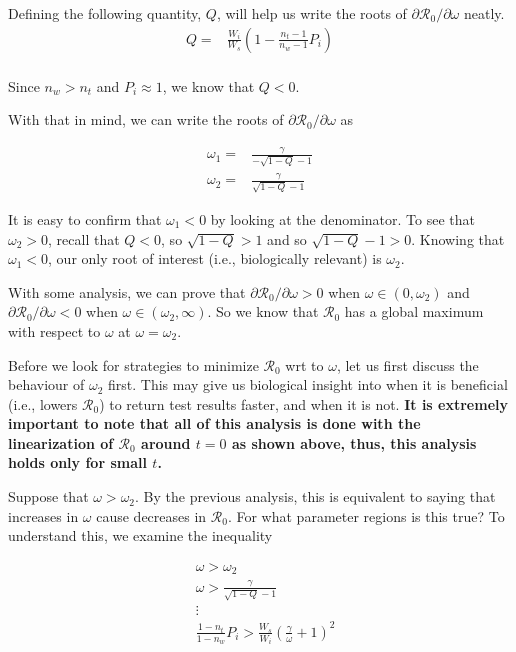 \documentclass{article}
\newcommand{\Rnum}{\mathcal{R}_0}
\begin{document}
Defining the following quantity, $Q$, will help us write the roots of $\partial{\Rnum}/\partial{\omega}$ neatly. 
\begin{align}\label{eq:defQ}
    Q =& \frac{W_i}{W_s}\left(1-\frac{n_{t}-1}{n_{w}-1}P_{i}\right) \\
\end{align}

Since $n_w > n_t$ and $P_i \approx 1$, we know that $Q < 0$.

With that in mind, we can write the roots of $\partial{\Rnum}/\partial{\omega}$ as

\begin{align}
    \omega_1 =& \frac{\gamma}{-\sqrt{1-Q}-1} \\
    \omega_2 =& \frac{\gamma}{\sqrt{1-Q}-1}
\end{align}

It is easy to confirm that $\omega_1 < 0$ by looking at the denominator. To see that $\omega_2 > 0$, recall that $Q < 0$, so $\sqrt{1-Q} > 1$ and so $\sqrt{1-Q} -1 > 0$. Knowing that $\omega_1 < 0$, our only root of interest (i.e., biologically relevant) is $\omega_2$. 

With some analysis, we can prove that $\partial{\Rnum}/\partial{\omega} > 0$ when $\omega \in (0,\omega_2)$ and $\partial{\Rnum}/\partial{\omega} < 0$ when $\omega \in (\omega_2,\infty)$. So we know that $\Rnum$ has a global maximum with respect to $\omega$ at $\omega = \omega_2$.

Before we look for strategies to minimize $\Rnum$ wrt to $\omega$, let us first discuss the behaviour of $\omega_2$ first. This may give us biological insight into when it is beneficial (i.e., lowers $\Rnum$) to return test results faster, and when it is not. \textbf{It is extremely important to note that all of this analysis is done with the linearization of $\Rnum$ around $t = 0$ as shown above, thus, this analysis holds only for small $t$.}

Suppose that $\omega > \omega_2$. By the previous analysis, this is equivalent to saying that increases in $\omega$ cause decreases in $\Rnum$. For what parameter regions is this true? To understand this, we examine the inequality

\begin{align}\label{eq:necsuf}
    &\omega > \omega_2 \nonumber \\
    &\omega > \frac{\gamma}{\sqrt{1-Q}-1} \nonumber \\
    &\vdots \nonumber \\
    &\frac{1-n_{t}}{1-n_{w}}P_{i}>\frac{W_{s}}{W_{i}}\left(\frac{\gamma}{\omega}+1\right)^{2}
\end{align}
\end{document}
